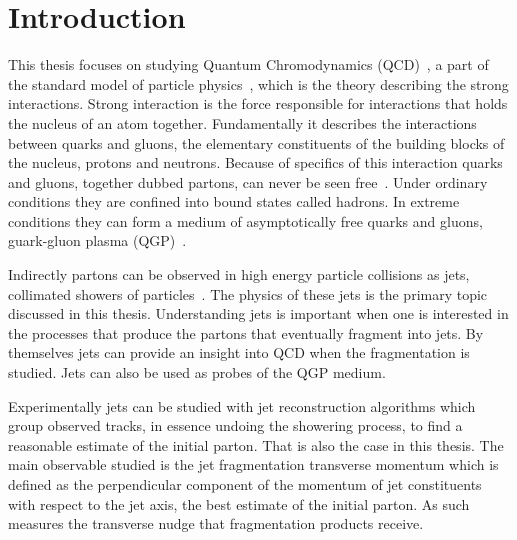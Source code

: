 
%
%
\tableofcontents

\clearpage
\chapter{Introduction}
\label{sec:introduction}
This thesis focuses on studying Quantum Chromodynamics (QCD)~\cite{gross1973asymptotically}, a part of the standard model of particle physics~\cite{Tanabashi:2018oca}, which is the theory describing the strong interactions. Strong interaction is the force responsible for interactions that holds the nucleus of an atom together. Fundamentally it describes the interactions between quarks and gluons, the elementary constituents of the building blocks of the nucleus, protons and neutrons. Because of specifics of this interaction quarks and gluons, together dubbed partons, can never be seen free~\cite{Perl:2004qc}. Under ordinary conditions they are confined into bound states called hadrons. In extreme conditions they can form a medium of asymptotically free quarks and gluons, guark-gluon plasma (QGP)~\cite{Shuryak:1980}. %

Indirectly partons can be observed in high energy particle collisions as jets, collimated showers of particles~\cite{Perkins:1982xb}. The physics of these jets is the primary topic discussed in this thesis. Understanding jets is important when one is interested in the processes that produce the partons that eventually fragment into jets. By themselves jets can provide an insight into QCD when the fragmentation is studied. Jets can also be used as probes of the QGP medium. 

Experimentally jets can be studied with jet reconstruction algorithms which group observed tracks, in essence undoing the showering process, to find a reasonable estimate of the initial parton. That is also the case in this thesis. The main observable studied is the jet fragmentation transverse momentum \jt{} which is defined as the perpendicular component of the momentum of jet constituents with respect to the jet axis, the best estimate of the initial parton. As such \jt{} measures the transverse nudge that fragmentation products receive.

